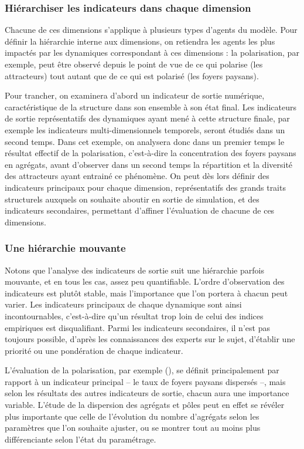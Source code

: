 \subsubsection{Hiérarchiser les indicateurs dans chaque dimension}\label{par:hierarchie_interne}
Chacune de ces dimensions s'applique à plusieurs types d'agents du modèle.
Pour définir la hiérarchie interne aux dimensions, on retiendra les agents les plus impactés par les dynamiques correspondant à ces dimensions :
la polarisation, par exemple, peut être observé depuis le point de vue de ce qui polarise (les attracteurs) tout autant que de ce qui est polarisé (les foyers paysans).

Pour trancher, on examinera d'abord un indicateur de sortie numérique, caractéristique de la structure dans son ensemble à son état final.
Les indicateurs de sortie représentatifs des dynamiques ayant mené à cette structure finale, par exemple les indicateurs multi-dimensionnels temporels, seront étudiés dans un second temps.
Dans cet exemple, on analysera donc dans un premier temps le résultat effectif de la polarisation, c'est-à-dire la concentration des foyers paysans en agrégats, avant d'observer dans un second temps la répartition et la diversité des attracteurs ayant entrainé ce phénomène.
On peut dès lors définir des \og indicateurs principaux\fg{} pour chaque dimension, représentatifs des grands traits structurels auxquels on souhaite aboutir en sortie de simulation, et des \og indicateurs secondaires\fg{}, permettant d'affiner l'évaluation de chacune de ces dimensions.

\subsubsection{Une hiérarchie mouvante}
Notons que l'analyse des indicateurs de sortie suit une hiérarchie parfois mouvante, et en tous les cas, assez peu quantifiable.
L'ordre d'observation des indicateurs est plutôt stable, mais l'importance que l'on portera à chacun peut varier.
Les indicateurs principaux de chaque dynamique sont ainsi \og incontournables\fg{}, c'est-à-dire qu'un résultat trop loin de celui des indices empiriques est disqualifiant.
Parmi les indicateurs secondaires, il n'est pas toujours possible, d'après les connaissances des experts sur le sujet, d'établir une priorité ou une pondération de chaque indicateur.

L'évaluation de la polarisation, par exemple (), se définit principalement par rapport à un indicateur principal -- le taux de foyers paysans dispersés --, mais selon les résultats des autres indicateurs de sortie, chacun aura une importance variable.
L'étude de la dispersion des agrégats et pôles peut en effet se révéler plus importante que celle de l'évolution du nombre d'agrégats selon les paramètres que l'on souhaite ajuster, ou se montrer tout au moins plus différenciante selon l'état du paramétrage.

